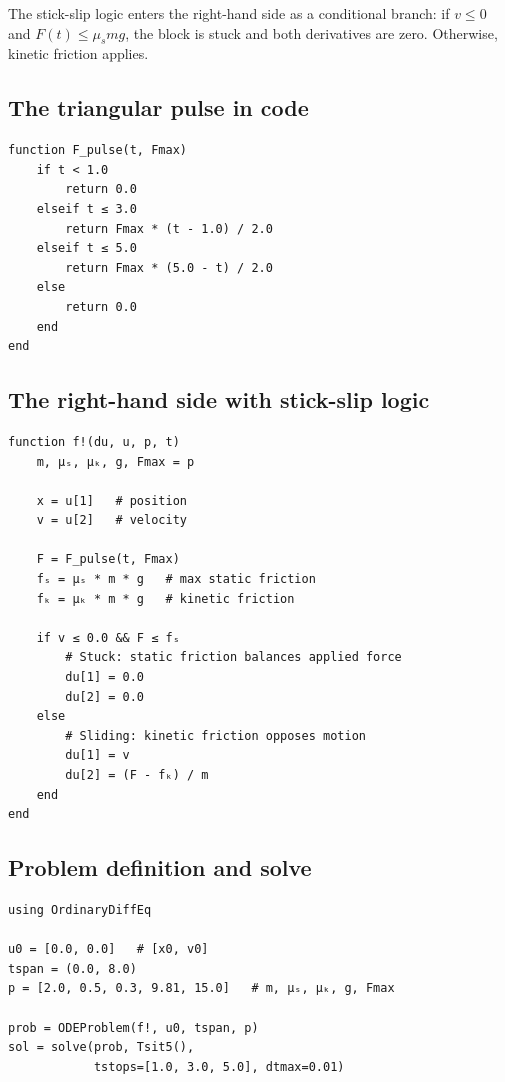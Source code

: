 \documentclass[11pt, a4paper]{article}
\begin{document}
\noindent
The stick-slip logic enters the right-hand side as a conditional branch:
if $v \le 0$ and $F(t) \le \mu_s mg$, the block is stuck and both derivatives
are zero.  Otherwise, kinetic friction applies.

\subsection{The triangular pulse in code}

\begin{lstlisting}[caption={Triangular force pulse. Returns zero outside
  $[1, 5]$, ramps linearly to \texttt{Fmax} at $t = 3$.}]
function F_pulse(t, Fmax)
    if t < 1.0
        return 0.0
    elseif t ≤ 3.0
        return Fmax * (t - 1.0) / 2.0
    elseif t ≤ 5.0
        return Fmax * (5.0 - t) / 2.0
    else
        return 0.0
    end
end
\end{lstlisting}

\subsection{The right-hand side with stick-slip logic}

\begin{lstlisting}[caption={In-place RHS function for
  \texttt{OrdinaryDiffEq.jl}.  The conditional branch encodes
  the static/kinetic friction transition.}]
function f!(du, u, p, t)
    m, μₛ, μₖ, g, Fmax = p

    x = u[1]   # position
    v = u[2]   # velocity

    F = F_pulse(t, Fmax)
    fₛ = μₛ * m * g   # max static friction
    fₖ = μₖ * m * g   # kinetic friction

    if v ≤ 0.0 && F ≤ fₛ
        # Stuck: static friction balances applied force
        du[1] = 0.0
        du[2] = 0.0
    else
        # Sliding: kinetic friction opposes motion
        du[1] = v
        du[2] = (F - fₖ) / m
    end
end
\end{lstlisting}

\subsection{Problem definition and solve}

\begin{lstlisting}[caption={Setting up and solving the ODE.  The key
  subtlety: \texttt{tstops} forces the adaptive integrator to step
  at force discontinuities, and \texttt{dtmax} prevents it from
  leaping over the stick-slip transition.}]
using OrdinaryDiffEq

u0 = [0.0, 0.0]   # [x0, v0]
tspan = (0.0, 8.0)
p = [2.0, 0.5, 0.3, 9.81, 15.0]   # m, μₛ, μₖ, g, Fmax

prob = ODEProblem(f!, u0, tspan, p)
sol = solve(prob, Tsit5(),
            tstops=[1.0, 3.0, 5.0], dtmax=0.01)
\end{lstlisting}
\end{document}
